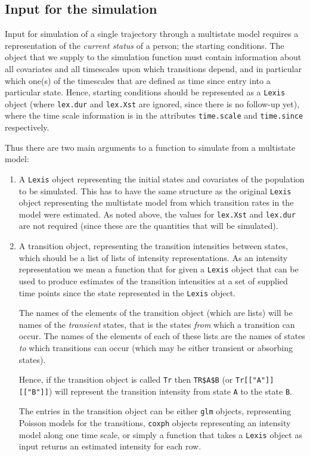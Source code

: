 \documentclass[a4paper,twoside,12pt]{report}
\begin{document}
\subsection{Input for the simulation}

Input for simulation of a single trajectory through a multistate model
requires a representation of the \emph{current status} of a person;
the starting conditions. The object that we supply to the simulation
function must contain information about all covariates and all
timescales upon which transitions depend, and in particular which
one(s) of the timescales that are defined as time since entry into a
particular state. Hence, starting conditions should be represented as
a \texttt{Lexis} object (where \texttt{lex.dur} and \texttt{lex.Xst}
are ignored, since there is no follow-up yet), where the time scale
information is in the attributes \texttt{time.scale} and
\texttt{time.since} respectively.

Thus there are two main arguments to a function to simulate from a
multistate model:
\begin{enumerate}
\item A \texttt{Lexis} object representing the initial states and
  covariates of the population to be simulated. This has to have the
  same structure as the original \texttt{Lexis} object representing
  the multistate model from which transition rates in the model were
  estimated. As noted above, the values for \texttt{lex.Xst} and
  \texttt{lex.dur} are not required (since these are the quantities
  that will be simulated).
\item A transition object, representing the transition intensities
  between states, which should be a list of lists of intensity
  representations. As an intensity representation we mean a function
  that for given a \texttt{Lexis} object that can be used to produce
  estimates of the transition intensities at a set of supplied time
  points since the state represented in the \texttt{Lexis} object.

  The names of the elements of the transition object (which are lists)
  will be names of the \emph{transient} states, that is the states
  \emph{from} which a transition can occur. The names of the elements
  of each of these lists are the names of states \emph{to} which
  transitions can occur (which may be either transient or absorbing
  states).

  Hence, if the transition object is called \texttt{Tr} then
  \verb+TR$A$B+ (or \verb+Tr[["A"]][["B"]]+) will represent the
  transition intensity from state \texttt{A} to the state \texttt{B}.

  The entries in the transition object can be either \texttt{glm}
  objects, representing Poisson models for the transitions,
  \texttt{coxph} objects representing an intensity model along one
  time scale, or simply a function that takes a \texttt{Lexis}
  object as input returns an estimated intensity for each row.

\end{enumerate}
\end{document}

